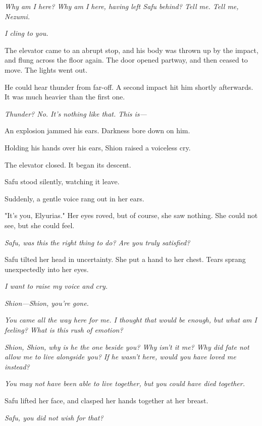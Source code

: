 \emph{Why am I here? Why am I here, having left Safu behind? Tell me. Tell me,
Nezumi.}

\emph{I cling to you.}

The elevator came to an abrupt stop, and his body was thrown up by the
impact, and flung across the floor again. The door opened partway, and
then ceased to move. The lights went out.

He could hear thunder from far-off. A second impact hit him shortly
afterwards. It was much heavier than the first one.

\emph{Thunder? No. It's nothing like that. This is---}

An explosion jammed his ears. Darkness bore down on him.

Holding his hands over his ears, Shion raised a voiceless cry.

The elevator closed. It began its descent.

Safu stood silently, watching it leave.

Suddenly, a gentle voice rang out in her ears.

"It's you, Elyurias." Her eyes roved, but of course, she saw nothing.
She could not see, but she could feel.

\myspace

\emph{Safu, was this the right thing to do? Are you truly satisfied?}

\myspace

Safu tilted her head in uncertainty. She put a hand to her chest. Tears
sprang unexpectedly into her eyes.

\emph{I want to raise my voice and cry.}

\emph{Shion---Shion, you're gone.}

\emph{You came all the way here for me. I thought that would be enough, but
what am I feeling? What is this rush of emotion?}

\emph{Shion, Shion, why is he the one beside you? Why isn't it me? Why did
fate not allow me to live alongside you? If he wasn't here, would you
have loved me instead?}

\myspace

\emph{You may not have been able to live together, but you could have died
together.}

\myspace

Safu lifted her face, and clasped her hands together at her breast.

\myspace

\emph{Safu, you did not wish for that?}

